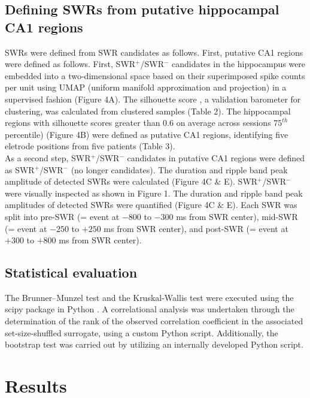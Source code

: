 \documentclass[final,3p,times,twocolumn]{elsarticle}
\begin{document}
\subsection{Defining SWRs from putative hippocampal CA1 regions}
SWRs were defined from SWR candidates as follows. First, putative CA1 regions were defined as follows. First, SWR$^+$/SWR$^-$ candidates in the hippocampus were embedded into a two-dimensional space based on their superimposed spike counts per unit using UMAP (uniform manifold approximation and projection) \cite{mcinnes_umap_2018} in a supervised fashion (Figure 4A). The silhouette score \cite{rousseeuw_silhouettes_1987}, a validation barometer for clustering, was calculated from clustered samples (Table 2). The hippocampal regions with silhouette scores greater than 0.6 on average across sessions $75^{th}$ percentile) (Figure 4B) were defined as putative CA1 regions, identifying five eletrode positions from five patients (Table 3).
\\
\indent
As a second step, SWR$^+$/SWR$^-$ candidates in putative CA1 regions were defined as SWR$^+$/SWR$^-$ (no longer candidates). The duration and ripple band peak amplitude of detected SWRs were calculated (Figure 4C \& E). SWR$^+$/SWR$^-$ were visually inspected as shown in Figure 1. The duration and ripple band peak amplitudes of detected SWRs were quantified (Figure 4C \& E). Each SWR was split into pre-SWR (= event at $-800$ to $-300$ ms from SWR center), mid-SWR (= event at $-250$ to $+250$ ms from SWR center), and post-SWR (= event at $+300$ to $+800$ ms from SWR center).

\subsection{Statistical evaluation}
The Brunner--Munzel test and the Kruskal-Wallis test were executed using the scipy package in Python \cite{virtanen_scipy_2020}. A correlational analysis was undertaken through the determination of the rank of the observed correlation coefficient in the associated set-size-shuffled surrogate, using a custom Python script. Additionally, the bootstrap test was carried out by utilizing an internally developed Python script.
\label{sec:methods}
\section{Results}
\end{document}
